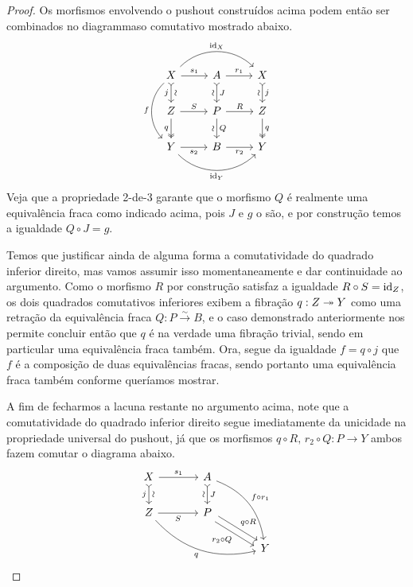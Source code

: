 \begin{proof}
  Os morfismos envolvendo o pushout construídos acima podem então ser combinados no diagrammaso comutativo mostrado abaixo.
  \begin{displaymath}
    \begin{tikzcd}
      X
      \arrow[r, "s_{1}"]
      \arrow[d, tail, "j" {swap}, "\sim" {sloped}]
      \arrow[rr, bend left=45, "\id_{X}"]
      \arrow[dd, bend right=45, "f" swap]
      & A
      \arrow[d, tail, "J", "\sim" {swap,sloped}]
      \arrow[r, "r_{1}"]
      & X
      \arrow[d, tail, "j", "\sim" {swap,sloped}]
      \\ Z
      \arrow[r, "S"]
      \arrow[d, two heads, "q" swap]
      & P
      \arrow[d, "Q", "\sim" {swap,sloped}]
      \arrow[r, "R"]
      & Z
      \arrow[d, two heads, "q"]
      \\ Y
      \arrow[r, "s_{2}" swap]
      \arrow[rr, bend right=45, "\id_{Y}" swap]
      & B
      \arrow[r, "r_{2}" swap]
      & Y
    \end{tikzcd}
  \end{displaymath}
  Veja que a propriedade 2-de-3 garante que o morfismo $Q$ é realmente uma equivalência fraca como indicado acima, pois $J$ e $g$ o são, e por construção temos a igualdade $Q \circ J = g$.

  Temos que justificar ainda de alguma forma a comutatividade do quadrado inferior direito, mas vamos assumir isso momentaneamente e dar continuidade ao argumento.
  Como o morfismo $R$ por construção satisfaz a igualdade $R \circ S = \mathrm{id}_{Z}$, os dois quadrados comutativos inferiores exibem a fibração $q: Z \twoheadrightarrow Y$ como uma retração da equivalência fraca $Q: P \overset{\sim}{\to} B$, e o caso demonstrado anteriormente nos permite concluir então que $q$ é na verdade uma fibração trivial, sendo em particular uma equivalência fraca também.
  Ora, segue da igualdade $f = q \circ j$ que $f$ é a composição de duas equivalências fracas, sendo portanto uma equivalência fraca também conforme queríamos mostrar.

  A fim de fecharmos a lacuna restante no argumento acima, note que a comutatividade do quadrado inferior direito segue imediatamente da unicidade na propriedade universal do pushout, já que os morfismos $q \circ R,\, r_{2} \circ Q: P \to Y$ ambos fazem comutar o diagrama abaixo.
  \begin{displaymath}
    \begin{tikzcd}[column sep=1.25cm]
       X
      \arrow[r, "s_{1}"]
      \arrow[d, tail, "j" {swap}, "\sim" {sloped}]
      & A
      \arrow[d, tail , "J", "\sim" {swap,sloped}]
      \arrow[rdd, bend left=30, "f \circ r_{1}"]
      \\ Z
      \arrow[r, "S" swap]
      \arrow[rrd, bend right=30, "q" swap]
      & P
      \arrow[rd, shift left=1.2, "q \circ R"]
      \arrow[rd, shift right=1.2, "r_{2} \circ Q" swap]
      \\ & & Y
    \end{tikzcd} \qedhere
  \end{displaymath}


\end{proof}
